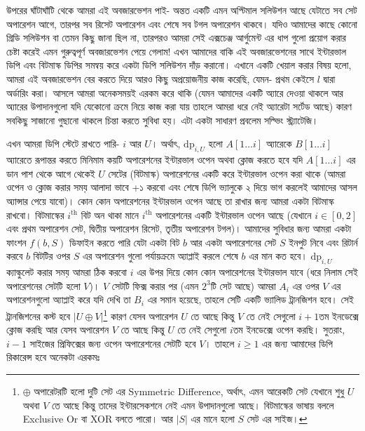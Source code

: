 \begin{solution}
উপরের ঘাঁটাঘাঁটি থেকে আমরা এই অবজারভেশন পাই- অন্তত একটি এমন অপ্টিমাল সলিউশন আছে যেটাতে সব সেট অপারেশন আগে, তারপর সব রিসেট অপারেশন এবং শেষে সব টগল অপারেশন থাকবে। যদিও আমাদের কাছে কোনো গ্রিডি সলিউশন বা তেমন কিছু জানা ছিল না, তারপরও আমরা সেই এক্সচেঞ্জ আর্গুমেন্ট এর ধাপ গুলো প্রয়োগ করার চেষ্টা করেই এমন গুরুত্বপূর্ণ অবজারভেশন পেয়ে গেলাম! এখন আমাদের বাকি এই অবজারভেশনের সাথে ইন্টারভাল ডিপি এবং বিটমাস্ক ডিপির সমন্বয় করে একটা ডিপি সলিউশন দাঁড় করানো। এখানে একটি খেয়াল করার বিষয় হলো, আমরা এই অবজারভেশন বের করতে দিয়ে আরও কিছু অপ্রয়োজনীয় কাজ করেছি, যেমন- প্রথম কেইসে $l$ দ্বারা অর্ডারিং করা। আসলে আমরা অনেকসময়ই এরকম করে থাকি (যেমন আমাদের একটি অ্যারে দেওয়া থাকলে আর অ্যারের উপাদানগুলো যদি যেকোনো ক্রমে নিয়ে কাজ করা যায় তাহলে আমরা ধরে নেই অ্যারেটা সর্টেড আছে) কারণ সবকিছু সাজানো গুছানো থাকলে চিন্তা করতে সুবিধা হয়। এটা একটা সাধারণ প্রবলেম সল্ভিং স্ট্র্যাটেজি।

এখন আমরা ডিপি স্টেটে রাখতে পারি- $i$ আর $U$। অর্থাৎ, $\text{dp}_{i, U}$ হলো $A[1 \ldots i]$ অ্যারেকে $B[1 \ldots i]$ অ্যারেতে রূপান্তর করতে মিনিমাম কয়টি অপারেশনের ইন্টারভাল ওপেন অথবা ক্লোজ করতে হবে যদি $A[1\ldots i]$ এর ডান পাশ থেকে আগে থেকেই $U$ সেটের (বিটমাস্ক) অপারেশনের একটি করে ইন্টারভাল ওপেন করা থাকে (আমরা ওপেন ও ক্লোজ করার সময় আলাদা ভাবে +১ করবো এবং শেষে ডিপি ভ্যালুকে ২ দিয়ে ভাগ করলেই আমাদের আসল অ্যান্সার পেয়ে যাবো)। কোন কোন অপারেশনের ইন্টারভাল ওপেন আছে তা রাখার জন্য আমরা একটা বিটমাস্ক রাখবো। বিটমাস্কের $i^{\text{th}}$ বিট অন থাকা মানে $i^{\text{th}}$ অপারেশনের একটি ইন্টারভাল ওপেন আছে (যেখানে $i \in [0, 2]$ এবং প্রথম অপারেশন সেট, দ্বিতীয় অপারেশন রিসেট, তৃতীয় অপারেশন টগল)। আমাদের সুবিধার জন্য আমরা একটা ফাংশন $f(b, S)$ ডিফাইন করতে পারি যেটা একটা বিট $b$ আর একটা অপারেশনের সেট $S$ ইনপুট নিবে এবং রিটার্ন করবে $b$ বিটটির ওপর $S$ এর অপারেশন গুলো পর্যায়ক্রমে অ্যাপ্লাই করলে শেষে $b$ এর মান কত হবে। $\text{dp}_{i, U}$ ক্যাল্কুলেট করার সময় আমরা ঠিক করবো $i$ এর উপর দিয়ে কোন কোন অপারেশনের ইন্টারভাল যাবে (ধরে নিলাম সেই অপারেশনের সেটটি হলো $V$)। $V$ সেটটি ফিক্স করার পর (এমন $2^{3}$টি সেট আছে) আমরা $A_i$ এর ওপর $V$ এর অপারেশনগুলো অ্যাপ্লাই করে যদি দেখি তা $B_i$ এর সমান হয়েছে, তাহলে সেটি একটি ভ্যালিড ট্রানজিশন হবে। সেই ট্রানজিশনের কস্ট হবে $|U \oplus V|$\footnote{$\oplus$ অপারেটরটি হলো দুটি সেট এর Symmetric Difference, অর্থাৎ, এমন আরেকটি সেট যেখানে শুধু $U$ অথবা $V$ তে আছে কিন্তু তাদের ইন্টারসেকশনে নেই এমন উপাদানগুলো আছে। বিটমাস্কের ভাষায় বললে Exclusive Or বা XOR বলতে পারো। আর $|S|$ এর মানে হলো $S$ সেট এর সাইজ।} কারণ যেসব অপারেশন $U$ তে আছে কিন্তু $V$ তে নেই সেগুলো $i+1$তম ইনডেক্সে ক্লোজ করছি আর যেসব অপারেশন $V$ তে আছে কিন্তু $U$ তে নেই সেগুলো $i$তম ইনডেক্সে ওপেন করছি। সুতরাং, $i-1$ সাইজের প্রিফিক্সের জন্য ওপেন অপারেশনের সেটটি হবে $V$। তাহলে $i \ge 1$ এর জন্য আমাদের ডিপি রিকারেন্স হবে অনেকটা এরকমঃ


\end{solution}
